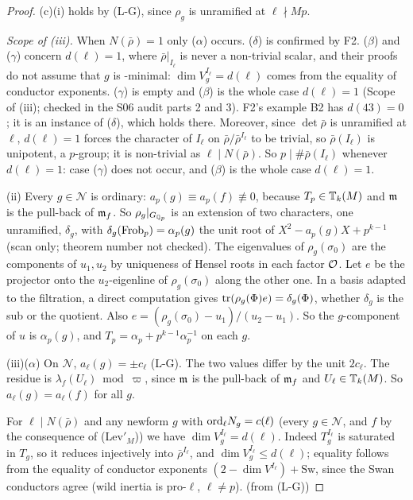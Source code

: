 \begin{proof}
(c)(i) holds by (L-G), since $\rho_g$ is unramified at $\ell\nmid Mp$.

\emph{Scope of (iii).} When $N(\bar\rho)=1$ only ($\alpha$) occurs. ($\delta$) is confirmed by F2. ($\beta$) and ($\gamma$) concern $d(\ell)=1$, where
$\bar\rho|_{I_\ell}$ is never a non-trivial scalar, and their proofs do not assume that $g$ is \cite{KO}-minimal: $\dim V_g^{I_\ell}=d(\ell)$ comes from the equality of conductor exponents. ($\gamma$) is empty and ($\beta$) is the whole case $d(\ell)=1$ (Scope of (iii); checked in the S06 audit parts 2 and 3). F2's example B2 has $d(43)=0$; it is an instance of ($\delta$),
which holds there. Moreover, since $\det\bar\rho$ is unramified at $\ell$, $d(\ell)=1$ forces the character of $I_\ell$ on
$\bar\rho/\bar\rho^{I_\ell}$ to be trivial, so $\bar\rho(I_\ell)$ is unipotent, a $p$-group; it is non-trivial as $\ell\mid N(\bar\rho)$. So
$p\mid\#\bar\rho(I_\ell)$ whenever $d(\ell)=1$: case ($\gamma$) does not occur, and ($\beta$) is the whole case $d(\ell)=1$. \stproved
{}

(ii) Every $g\in\mathcal N$ is ordinary: $a_p(g)\equiv a_p(f)\not\equiv0$, because $T_p\in\mathbb{T}_k(M)$ and $\mathfrak{m}$ is the pull-back of $\mathfrak{m}_f$. So
$\rho_g|_{G_{\mathbb{Q}_p}}$ is an extension of two characters, one unramified, $\delta_g$, with $\delta_g(\mathrm{Frob}_p)=\alpha_p(g)$ the unit root of
$X^2-a_p(g)X+p^{k-1}$ \cite[\S2]{W88} \stcited{} (scan only; theorem number not checked). The eigenvalues of $\rho_g(\sigma_0)$ are the components
of $u_1,u_2$ by uniqueness of Hensel roots in each factor $\mathcal{O}$. Let $e$ be the projector onto the $u_2$-eigenline of $\rho_g(\sigma_0)$ along
the other one. In a basis adapted to the filtration, a direct computation gives $\operatorname{tr}(\rho_g(\Phi)e)=\delta_g(\Phi)$, whether $\delta_g$ is
the sub or the quotient. Also $e=(\rho_g(\sigma_0)-u_1)/(u_2-u_1)$. So the $g$-component of $u$ is $\alpha_p(g)$, and
$T_p=\alpha_p+p^{k-1}\alpha_p^{-1}$ on each $g$.

(iii)($\alpha$) On $\mathcal N$, $a_\ell(g)=\pm c_\ell$ (L-G). The two values differ by the unit $2c_\ell$. The residue is $\lambda_f(U_\ell)\bmod\varpi$,
since $\mathfrak{m}$ is the pull-back of $\mathfrak{m}_f$ and $U_\ell\in\mathbb{T}_k(M)$. So $a_\ell(g)=a_\ell(f)$ for all $g$.

For $\ell\mid N(\bar\rho)$ and any newform $g$ with $\mathrm{ord}_\ell N_g=c(\ell)$ (every $g\in\mathcal N$, and $f$ by the consequence of
(Lev$'_M$)) we have $\dim V_g^{I_\ell}=d(\ell)$. Indeed $T_g^{I_\ell}$ is saturated in $T_g$, so it reduces injectively into
$\bar\rho^{I_\ell}$, and $\dim V_g^{I_\ell}\le d(\ell)$; equality follows from the equality of conductor exponents
$(2-\dim V^{I_\ell})+\mathrm{Sw}$, since the Swan conductors agree (wild inertia is pro-$\ell$, $\ell\ne p$). \stproved{} (from (L-G))


\end{proof}

